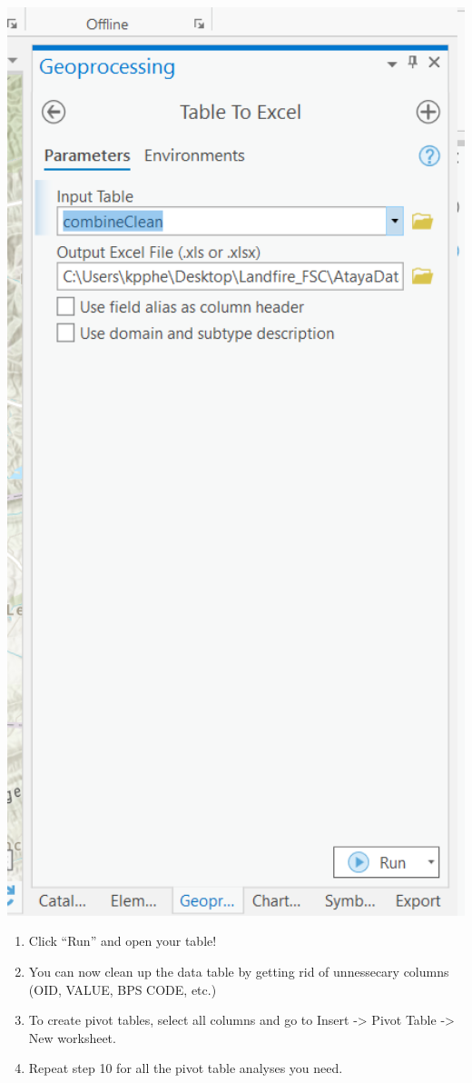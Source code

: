 \documentclass[
]{book}
\providecommand{\tightlist}{%
  \setlength{\itemsep}{0pt}\setlength{\parskip}{0pt}}
\begin{document}
\includegraphics[width=500pt]{04_gis_screenshots/20_Table_Excel}

\begin{enumerate}
\def\labelenumi{\arabic{enumi}.}
\setcounter{enumi}{7}
\tightlist
\item
  Click ``Run'' and open your table!
\item
  You can now clean up the data table by getting rid of unnessecary columns (OID, VALUE, BPS CODE, etc.)
\item
  To create pivot tables, select all columns and go to Insert -\textgreater{} Pivot Table -\textgreater{} New worksheet.
\item
  Repeat step 10 for all the pivot table analyses you need.
\end{enumerate}

  
\end{document}
